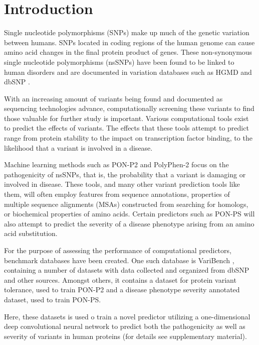 \documentclass{bioinfo}
\begin{document}
\section{Introduction}

Single nucleotide polymorphisms (SNPs) make up much of the genetic
variation between humans. SNPs located in coding regions of the human
genome can cause amino acid changes in the final protein product of
genes. These non-synonymous single nucleotide polymorphisms (nsSNPs)
have been found to be linked to human disorders and are documented in
variation databases such as HGMD \citep{Stenson2003} and dbSNP
\citep{Sherry2001}. 

With an increasing amount of variants being found and documented as
sequencing technologies advance, computationally screening these
variants to find those valuable for further study is
important. Various computational tools exist to predict the effects of
variants. The effects that these tools attempt to predict range from
protein stability to the impact on transcription factor binding, to
the likelihood that a variant is involved in a disease. 

Machine learning methods such as PON-P2 \citep{Niroula2015} and
PolyPhen-2 \citep{Adzhubei2013} focus on the pathogenicity of nsSNPs,
that is, the probability that a variant is damaging or involved in
disease. These tools, and many other variant prediction tools like
them, will often employ features from sequence annotations, properties
of multiple sequence alignments (MSAs) constructed from searching for
homologs, or biochemical properties of amino acids. Certain predictors
such as PON-PS \citep{Niroula2017} will also attempt to predict the
severity of a disease phenotype arising from an amino acid
substitution.  

For the purpose of assessing the performance of computational predictors, benchmark databases have been created. One such database is VariBench \citep{Nair2013}, containing a number of datasets with data collected and organized from dbSNP and other sources. Amongst others, it contains a dataset for protein variant tolerance, used to train PON-P2 and a disease phenotype severity annotated dataset, used to train PON-PS.

Here, these datasets is used o train a novel predictor utilizing a
one-dimensional deep convolutional neural network to predict both the
pathogenicity as well as severity of variants in human proteins (for
details see supplementary material). 
\end{document}
